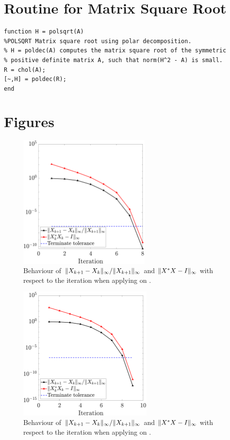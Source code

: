 \section{Routine for Matrix Square Root}\label{app:matrix-squareroot}
\begin{lstlisting}
function H = polsqrt(A)
%POLSQRT Matrix square root using polar decomposition.
% H = poldec(A) computes the matrix square root of the symmetric 
% positive definite matrix A, such that norm(H^2 - A) is small.
R = chol(A);
[~,H] = poldec(R);
end
\end{lstlisting}

\section{Figures}\label{app:figs}

\begin{figure}[H]
    \centering
    \includegraphics[width=0.59\textwidth]{../code/randn20.pdf}
    \caption{Behaviour of $\|{X_{k+1} - X_{k}}\|_\infty/\|{X_{k+1}}\|_\infty$ and $\|{X^* X - I}\|_\infty$ with respect to the iteration when applying  on .}
\end{figure}

\begin{figure}[H]
    \centering
    \includegraphics[width=0.6\textwidth]{../code/randn50.pdf}
    \caption{Behaviour of $\|{X_{k+1} - X_{k}}\|_\infty/\|{X_{k+1}}\|_\infty$ and $\|{X^* X - I}\|_\infty$ with respect to the iteration when applying  on .}
\end{figure}

